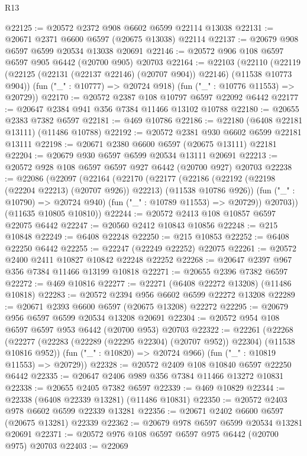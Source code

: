 \begin{lexlean}{R13}
\begin{coremodule}
@22125 := @20572 @2372 @908 @6602 @6599 @22114 @13038
@22131 := @20671 @2371 @6600 @6597 (@20675 @13038) @22114
@22137 := @20679 @908 @6597 @6599 @20534 @13038 @20691
@22146 := @20572 @906 @108 @6597 @6597 @905 @6442 (@20700 @905) @20703
@22164 := @22103
    (@22110
      (@22119 (@22125 (@22131 (@22137 @22146) (@20707 @904)) @22146) (@11538 @10773 @904))
      (fun ("_" : @10777) => @20724 @918)
      (fun ("_" : @10776 @11553) => @20729))
@22170 := @20572 @2387 @108 @10797 @6597 @22092 @6442
@22177 := @20647 @2384 @941 @356 @7384 @11466 @13102 @10788
@22180 := @20655 @2383 @7382 @6597
@22181 := @469 @10786
@22186 := @22180 (@6408 @22181 @13111) (@11486 @10788)
@22192 := @20572 @2381 @930 @6602 @6599 @22181 @13111
@22198 := @20671 @2380 @6600 @6597 (@20675 @13111) @22181
@22204 := @20679 @930 @6597 @6599 @20534 @13111 @20691
@22213 := @20572 @928 @108 @6597 @6597 @927 @6442 (@20700 @927) @20703
@22238 := @22086
    (@22097
      (@22164
        (@22170
          (@22177
            (@22186 (@22192 (@22198 (@22204 @22213) (@20707 @926)) @22213) (@11538 @10786 @926))
            (fun ("_" : @10790) => @20724 @940)
            (fun ("_" : @10789 @11553) => @20729))
          @20703))
      (@11635 @10805 @10810))
@22244 := @20572 @2413 @108 @10857 @6597 @22075 @6442
@22247 := @20560 @2412 @10843 @10856
@22248 := @215 @10848
@22249 := @6408 @22248
@22250 := @215 @10853
@22252 := @6408 @22250 @6442
@22255 := @22247 (@22249 @22252) @22075
@22261 := @20572 @2400 @2411 @10827 @10842 @22248 @22252
@22268 := @20647 @2397 @967 @356 @7384 @11466 @13199 @10818
@22271 := @20655 @2396 @7382 @6597
@22272 := @469 @10816
@22277 := @22271 (@6408 @22272 @13208) (@11486 @10818)
@22283 := @20572 @2394 @956 @6602 @6599 @22272 @13208
@22289 := @20671 @2393 @6600 @6597 (@20675 @13208) @22272
@22295 := @20679 @956 @6597 @6599 @20534 @13208 @20691
@22304 := @20572 @954 @108 @6597 @6597 @953 @6442 (@20700 @953) @20703
@22322 := @22261
    (@22268
      (@22277 (@22283 (@22289 (@22295 @22304) (@20707 @952)) @22304) (@11538 @10816 @952))
      (fun ("_" : @10820) => @20724 @966)
      (fun ("_" : @10819 @11553) => @20729))
@22328 := @20572 @2409 @108 @10840 @6597 @22250 @6442
@22335 := @20647 @2406 @989 @356 @7384 @11466 @13272 @10831
@22338 := @20655 @2405 @7382 @6597
@22339 := @469 @10829
@22344 := @22338 (@6408 @22339 @13281) (@11486 @10831)
@22350 := @20572 @2403 @978 @6602 @6599 @22339 @13281
@22356 := @20671 @2402 @6600 @6597 (@20675 @13281) @22339
@22362 := @20679 @978 @6597 @6599 @20534 @13281 @20691
@22371 := @20572 @976 @108 @6597 @6597 @975 @6442 (@20700 @975) @20703
@22403 := @22069

\end{coremodule}
\end{lexlean}

